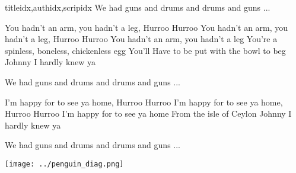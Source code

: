 \documentclass[14pt,letterpaper,norsk]{article}
\begin{document}
\begin{songs}{titleidx,authidx,scripidx}
\beginchorus
We had guns and drums and drums and guns ...
\endchorus

\beginverse
You hadn't an arm, you hadn't a leg,
Hurroo Hurroo
You hadn't an arm, you hadn't a leg,
Hurroo Hurroo
You hadn't an arm, you hadn't a leg
You're a spinless, boneless, chickenless egg
You'll Have to be put with the bowl to beg
Johnny I hardly knew ya
\endverse

\beginchorus
We had guns and drums and drums and guns ...
\endchorus

\beginverse
I'm happy for to see ya home,
Hurroo Hurroo
I'm happy for to see ya home,
Hurroo Hurroo
I'm happy for to see ya home
From the isle of Ceylon
Johnny I hardly knew ya
\endverse

\beginchorus
We had guns and drums and drums and guns ...
\endchorus
\endsong

\end{songs}

\newpage

\texttt{[image: ../penguin\_diag.png]}
\end{document}
